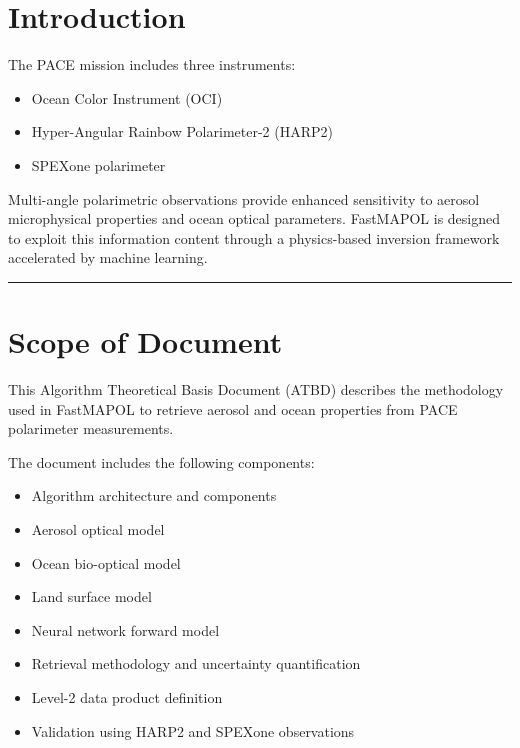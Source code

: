 \documentclass[
  letterpaper,
]{scrbook}
\providecommand{\tightlist}{%
  \setlength{\itemsep}{0pt}\setlength{\parskip}{0pt}}
\begin{document}

\chapter{Introduction}\label{introduction}

The PACE mission includes three instruments:

\begin{itemize}
\tightlist
\item
  Ocean Color Instrument (OCI)\\
\item
  Hyper-Angular Rainbow Polarimeter-2 (HARP2)\\
\item
  SPEXone polarimeter
\end{itemize}

Multi-angle polarimetric observations provide enhanced sensitivity to
aerosol microphysical properties and ocean optical parameters. FastMAPOL
is designed to exploit this information content through a physics-based
inversion framework accelerated by machine learning.

\begin{center}\rule{0.5\linewidth}{0.5pt}\end{center}


\chapter{Scope of Document}\label{scope-of-document}

This Algorithm Theoretical Basis Document (ATBD) describes the
methodology used in FastMAPOL to retrieve aerosol and ocean properties
from PACE polarimeter measurements.

The document includes the following components:

\begin{itemize}
\tightlist
\item
  Algorithm architecture and components\\
\item
  Aerosol optical model\\
\item
  Ocean bio-optical model\\
\item
  Land surface model\\
\item
  Neural network forward model\\
\item
  Retrieval methodology and uncertainty quantification\\
\item
  Level-2 data product definition\\
\item
  Validation using HARP2 and SPEXone observations
\end{itemize}
\end{document}

